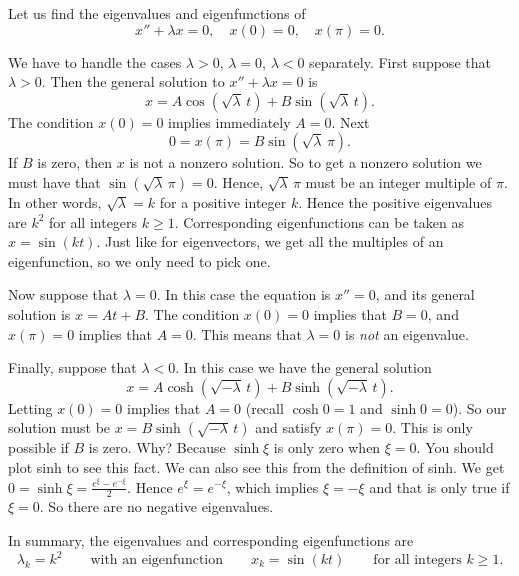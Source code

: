 \begin{example} \label{bvp:eig1ex}
Let us find the eigenvalues and eigenfunctions of
\begin{equation*}
x'' + \lambda x = 0, \quad x(0) = 0, \quad x(\pi) = 0 .
\end{equation*}

We have to handle
the cases $\lambda > 0$, $\lambda = 0$, $\lambda < 0$ separately.
First suppose that $\lambda > 0$.  Then
the general solution to $x''+\lambda x = 0$ is
\begin{equation*}
x = A \cos (\! \sqrt{\lambda}\, t) + B \sin (\! \sqrt{\lambda}\, t).
\end{equation*}
The condition $x(0) = 0$ implies immediately $A = 0$.
Next
\begin{equation*}
0 = x(\pi) = B \sin (\! \sqrt{\lambda}\, \pi ) .
\end{equation*}
If $B$ is zero, then $x$ is not a nonzero solution.  So to get a nonzero
solution we must have that $\sin (\! \sqrt{\lambda}\, \pi) = 0$.  Hence,
$\sqrt{\lambda}\, \pi$ must be an integer multiple of $\pi$.  In other words,
 $\sqrt{\lambda} = k$ for a positive integer $k$.
Hence the positive eigenvalues are
$k^2$ for all integers $k \geq 1$.  Corresponding eigenfunctions
can be taken as $x=\sin (k t)$.  Just like for eigenvectors, we get all the
multiples of an eigenfunction, so we only need to pick one.

Now suppose that $\lambda = 0$.  In this case the equation is $x'' = 0$,
and its general solution is $x = At + B$.  The condition $x(0) = 0$ implies
that $B=0$, and $x(\pi) = 0$ implies that $A = 0$.  This means that $\lambda
= 0$ is \emph{not} an eigenvalue.

Finally, suppose that $\lambda < 0$.  In this case we have the general solution
\begin{equation*}
x = A \cosh (\! \sqrt{-\lambda}\, t) + B \sinh (\! \sqrt{-\lambda}\, t ) .
\end{equation*}
Letting $x(0) = 0$ implies that $A = 0$ (recall $\cosh 0 = 1$ and $\sinh 0 =
0$).  So our solution must be $x = B \sinh (\! \sqrt{-\lambda}\, t )$ and satisfy
$x(\pi) = 0$.  This is only possible if $B$ is zero.  Why?  Because
$\sinh \xi$ is only zero when $\xi=0$.  You should plot sinh to see this
fact.
We can also see this from the definition of sinh.
We get $0 = \sinh \xi = \frac{e^\xi -
e^{-\xi}}{2}$.  Hence $e^\xi = e^{-\xi}$, which implies $\xi = -\xi$ and that is only
true if $\xi=0$.  So there are no negative eigenvalues.

In summary, the eigenvalues and corresponding eigenfunctions are
\begin{equation*}
\lambda_k = k^2 \qquad \text{with an eigenfunction} \qquad x_k = \sin (k t)
\qquad \text{for all integers } k \geq 1 .
\end{equation*}
\end{example}

